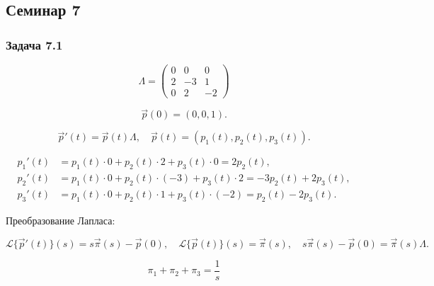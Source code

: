 
\subsection{Семинар 7}

\subsubsection*{Задача 7.1}




\[
	\Lambda =
	\begin{pmatrix}
		0 & 0  & 0  \\
		2 & -3 & 1  \\
		0 & 2  & -2
	\end{pmatrix}
\]

\[
	\vec{p}(0) = (0,0,1).
\]

\[
	\vec{p}'(t) = \vec{p}(t)\Lambda,\quad \vec{p}(t)=(p_1(t),p_2(t),p_3(t)).
\]

\[
	\begin{aligned}
		p_1'(t) & = p_1 (t)\cdot 0 + p_2(t)\cdot 2 + p_3(t)\cdot 0 = 2p_2(t),            \\
		p_2'(t) & = p_1 (t)\cdot 0 + p_2(t)\cdot(-3) + p_3(t)\cdot 2 = -3p_2(t)+2p_3(t), \\
		p_3'(t) & = p_1 (t)\cdot 0 + p_2(t)\cdot 1 + p_3(t)\cdot(-2) = p_2(t)-2p_3(t).
	\end{aligned}
\]

Преобразование Лапласа:

\[
	\mathcal{L}\{\vec p'(t)\}(s)=s \vec \pi(s)-\vec p(0)
	,\quad
	\mathcal{L}\{\vec p(t)\}(s)=\vec \pi(s)
	,\quad
	s \vec \pi(s)-\vec p(0)=\vec \pi(s)\Lambda.
\]

\[
	\pi_1+\pi_2+\pi_3=\frac{1}{s}
\]

